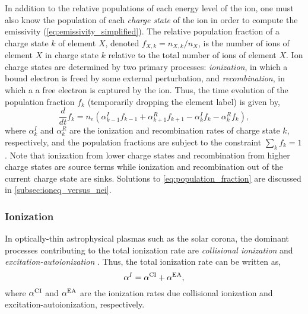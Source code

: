 In addition to the relative populations of each energy level of the ion, one must also know the population of each \textit{charge state} of the ion in order to compute the emissivity (\autoref{eq:emissivity_simplified}). The relative population fraction of a charge state $k$ of element $X$, denoted $f_{X,k}=n_{X,k}/n_X$, is the number of ions of element $X$ in charge state $k$ relative to the total number of ions of element $X$. Ion charge states are determined by two primary processes: \textit{ionization}, in which a bound electron is freed by some external perturbation, and \textit{recombination}, in which a a free electron is captured by the ion. Thus, the time evolution of the population fraction $f_k$ (temporarily dropping the element label) is given by,
\begin{equation}\label{eq:population_fraction}
    \frac{d}{dt}f_k = n_e(\alpha_{k-1}^I f_{k-1} + \alpha_{k+1}^R f_{k+1} - \alpha_{k}^I f_k - \alpha_k^R f_k),
\end{equation}
where $\alpha_k^I$ and $\alpha_k^R$ are the ionization and recombination rates of charge state $k$, respectively, and the population fractions are subject to the constraint $\sum_kf_k=1$ \citep{del_zanna_solar_2018}. Note that ionization from lower charge states and recombination from higher charge states are source terms while ionization and recombination out of the current charge state are sinks. Solutions to \autoref{eq:population_fraction} are discussed in \autoref{subsec:ioneq_versus_nei}.

\subsubsection{Ionization}

In optically-thin astrophysical plasmas such as the solar corona, the dominant processes contributing to the total ionization rate are \textit{collisional ionization} and \textit{excitation-autoionization} \citep{bradshaw_collisional_2013}. Thus, the total ionization rate can be written as,
\begin{equation}\label{eq:total_ionization_rate}
    \alpha^I = \alpha^\textup{CI} + \alpha^\textup{EA},
\end{equation}
where $\alpha^\textup{CI}$ and $\alpha^\textup{EA}$ are the ionization rates due collisional ionization and excitation-autoionization, respectively. 

